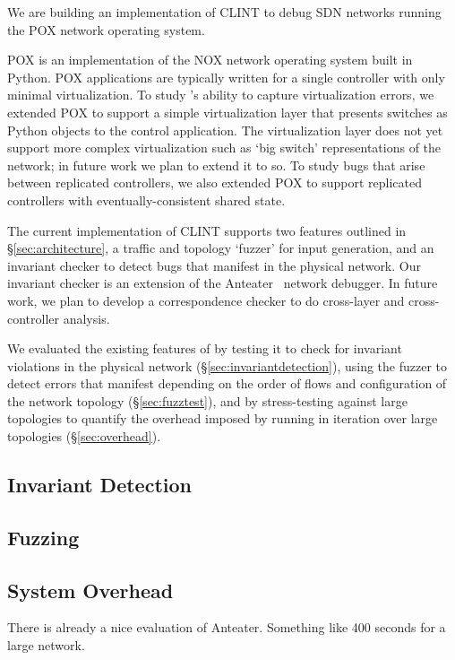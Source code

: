     We are building an implementation of CLINT to debug SDN networks running the POX network operating system.
    
    POX is an implementation of the NOX network operating system built in Python.
    POX applications are typically written for a single controller with only minimal virtualization.
    To study \projectname{}'s ability to capture virtualization errors, we extended POX
    to support a simple virtualization layer that presents switches as Python objects to the control application.
    The virtualization layer does not yet support more complex virtualization such as `big switch' representations 
    of the network; in future work we plan to extend it to so.
    To study bugs that arise between replicated controllers, we also extended POX to support replicated controllers
    with eventually-consistent shared state.

    The current implementation of CLINT supports two features outlined in \S\ref{sec:architecture}, a traffic and topology `fuzzer' for input generation, and an invariant checker to detect bugs that manifest in the physical network.
    Our invariant checker is an extension of the Anteater~\cite{anteater} network debugger.
    In future work, we plan to develop a correspondence checker to do cross-layer and cross-controller analysis.

    We evaluated the existing features of \projectname{} by testing it to check for invariant violations in the physical network (\S\ref{sec:invariantdetection}), using the fuzzer to detect errors that manifest depending on the order of flows and configuration of the network topology (\S\ref{sec:fuzztest}), and by stress-testing \projectname{} against large topologies to quantify the overhead imposed by running \projectname{} in iteration over large topologies (\S\ref{sec:overhead}). 
    \subsection{Invariant Detection}

    \subsection{Fuzzing}

        
    \subsection{System Overhead}

    There is already a nice evaluation of Anteater. Something like 400 seconds for
    a large network.

